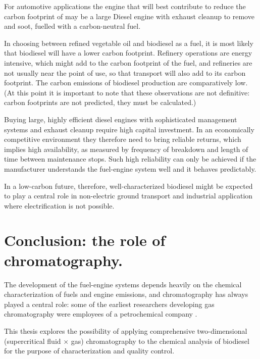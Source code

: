For automotive applications the engine that will best contribute to reduce the
carbon footprint of may be a large Diesel engine with exhaust cleanup to remove
\nox and soot, fuelled with a carbon-neutral fuel.

In choosing between refined vegetable oil and biodiesel as a fuel, it is most
likely that biodiesel will have a lower carbon footprint. Refinery operations
are energy intensive, which might add to the carbon footprint of the fuel, and
refineries are not usually near the point of use, so that transport will also
add to its carbon footprint. The carbon emissions of biodiesel production are
comparatively low. (At this point it is important to note that these
observations are not definitive: carbon footprints are not predicted, they must
be calculated.)

Buying large, highly efficient diesel engines with sophisticated management
systems and exhaust cleanup require high capital investment. In an economically
competitive environment they therefore need to bring reliable returns, which
implies high availability, as measured by frequency of breakdown and length of
time between maintenance stops. Such high reliability can only be achieved if
the manufacturer understands the fuel-engine system well and it behaves
predictably.

In a low-carbon future, therefore, well-characterized biodiesel might be
expected to play a central role in non-electric ground transport and industrial
application where electrification is not possible.

\section{Conclusion: the role of chromatography.}

The development of the fuel-engine systems depends heavily on the chemical
characterization of fuels and engine emissions, and chromatography has always
played a central role: some of the earliest researchers developing gas
chromatography were employees of a petrochemical company
\autocite{Keulemans1955}.

This thesis explores the possibility of applying comprehensive two-dimensional
(supercritical fluid $\times$ gas) chromatography to the chemical
analysis of biodiesel for the purpose of characterization and quality control. 


